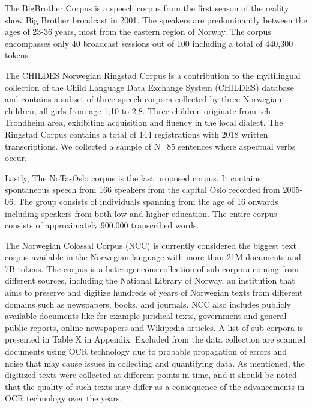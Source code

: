 \documentclass{article}
\begin{document}
The BigBrother Corpus is a speech corpus from the first season of the reality show Big Brother broadcast in 2001. The speakers are predominantly between the ages of 23-36 years, most from the eastern region of Norway. The corpus encompasses only 40 broadcast sessions out of 100 including a total of 440,300 tokens.

The CHILDES Norwegian Ringstad Corpus \parencite{larsen_byggeklossar_2014} is a contribution to the myltilingual collection of the Child Language Data Exchange System (CHILDES) database \parencite{macwhinney_childes_2000} and contains a subset of three speech corpora collected by three Norwegian children, all girls from age 1;10 to 2;8. Three children originate from teh Trondheim area, exhibiting acquisition and fluency in the local dialect. The Ringstad Corpus contains a total of 144 registrations with 2018 written transcriptions. We collected a sample of N=85 sentences where aspectual verbs occur.

Lastly, The NoTa-Oslo corpus \parencite{hagen_two_2014} is the last proposed corpus. It contains spontaneous speech from 166 speakers from the capital Oslo recorded from 2005-06. The group consists of individuals spanning from the age of 16 onwards including speakers from both low and higher education. The entire corpus consists of approximately 900,000 transcribed words.

The Norwegian Colossal Corpus (NCC) \parencite{kummervold_norwegian_2022} is currently considered the biggest text corpus available in the Norwegian language with more than 21M documents and 7B tokens. The corpus is a heterogeneous collection of sub-corpora coming from different sources,  including the National Library of Norway, an institution that aims to preserve and digitize hundreds of years of Norwegian texts from different domains such as newspapers, books, and journals. NCC also includes publicly available documents like for example juridical texts, government and general public reports, online newspapers and Wikipedia articles. A list of sub-corpora is presented in Table X in Appendix. Excluded from the data collection are scanned documents using OCR technology due to probable propagation of errors and noise that may cause issues in collecting and quantifying data. As \textcite{kummervold_norwegian_2022} mentioned, the digitized texts were collected at different points in time, and it should be noted that the quality of such texts may differ as a consequence of the advancements in OCR technology over the years.
\end{document}
